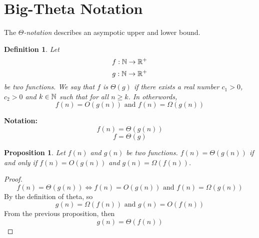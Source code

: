\documentclass[openany]{report}
\newtheorem{definition}{Definition}[section]
\newtheorem{prop}{Proposition}[section]
\begin{document}
\section{Big-Theta Notation}
The \emph{$\Theta$-notation} describes an asympotic upper and lower bound.
\begin{definition}
    Let 
    \[f: \mathbb{N} \rightarrow \mathbb{R}^+\]
    \[g: \mathbb{N} \rightarrow \mathbb{R}^+\]
    be two functions. We say that $f$ is $\Theta(g)$ if there exists a real number $c_1 > 0$, $c_2 > 0$ and $k \in \mathbb{N}$ such that for all $n \geq k$. In otherwords,
    \[f(n) = O(g(n)) \text{ and } f(n) = \Omega(g(n))\]
\end{definition}
\textbf{Notation:} 
\[f(n) = \Theta(g(n))\]
\[f = \Theta(g)\]
\begin{prop}
    Let $f(n)$ and $g(n)$ be two functions. $f(n) = \Theta(g(n))$ if and only if $f(n) = O(g(n))$ and $g(n) = \Omega(f(n))$.
\end{prop}
\begin{proof}
    \[f(n) = \Theta(g(n)) \iff f(n) = O(g(n)) \text{ and } f(n) = \Omega(g(n))\]
    By the definition of theta, so
    \[g(n) = \Omega(f(n)) \text{ and } g(n) = O(f(n))\]
    From the previous proposition, then 
    \[g(n) = \Theta(f(n))\]
\end{proof}
\end{document}
